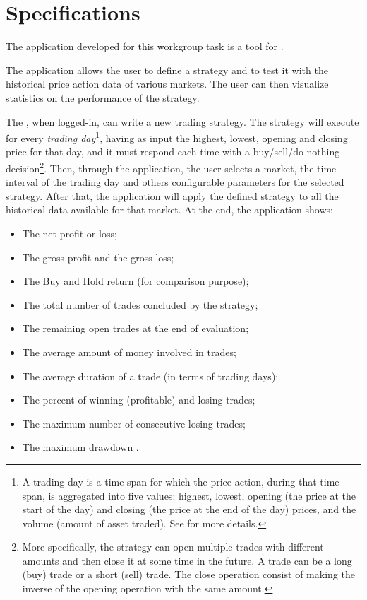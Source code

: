 \chapter{Specifications}\label{ch:specs}

The application developed for this workgroup task is a tool for
.

The application allows the user to define a strategy and to test it with the
historical price action data of various markets. The user can then visualize
statistics on the performance of the strategy.

The , when logged-in, can write a new trading strategy. The
strategy will execute for every \emph{trading day}\footnote{A trading day is a
time span for which the price action, during that time span, is aggregated into
five values: highest, lowest, opening (the price at the start of the day) and
closing (the price at the end of the day) prices, and the volume (amount of
asset traded). See  for more details.}, having as
input the highest, lowest, opening and closing price for that day, and it must
respond each time with a buy/sell/do-nothing decision\footnote{More
specifically, the strategy can open multiple trades with different amounts and
then close it at some time in the future. A trade can be a long (buy) trade or a
short (sell) trade. The close operation consist of making the inverse of the
opening operation with the same amount.}. Then, through the application, the
user selects a market, the time interval of the trading day and others
configurable parameters for the selected strategy. After that, the application
will apply the defined strategy to all the historical data available for that
market. At the end, the application shows:
\begin{itemize}
	\item The net profit or loss;
	\item The gross profit  and the gross loss;
	\item The Buy and Hold return (for comparison purpose);
	\item The total number of trades concluded by the strategy;
	\item The remaining open trades at the end of evaluation;
	\item The average amount of money involved in trades;
	\item The average duration of a trade (in terms of trading days);
	\item The percent of winning (profitable) and losing trades;
	\item The maximum number of consecutive losing trades;
	\item The maximum drawdown .
\end{itemize}


